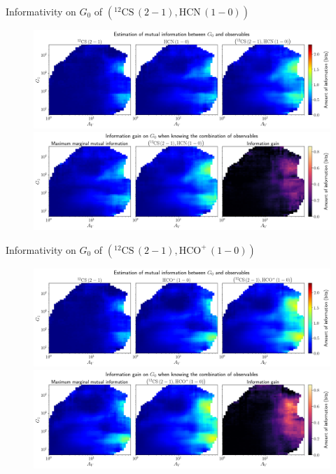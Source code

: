 \documentclass{beamer}
\begin{document}
\begin{frame}{Informativity on $G_0$ of $\left(\mathrm{^{12}CS\,(2-1)},\mathrm{HCN\,(1-0)}\right)$}
    \begin{figure}
        \centering
        \includegraphics[width=0.95\linewidth]{../mi/g0__12cs21_hcn10_mi.png}
        \vfill
        \includegraphics[width=0.95\linewidth]{../mi/g0__12cs21_hcn10_mi_gain.png}
    \end{figure}
\end{frame}

\begin{frame}{Informativity on $G_0$ of $\left(\mathrm{^{12}CS\,(2-1)},\mathrm{HCO^+\,(1-0)}\right)$}
    \begin{figure}
        \centering
        \includegraphics[width=0.95\linewidth]{../mi/g0__12cs21_hcop10_mi.png}
        \vfill
        \includegraphics[width=0.95\linewidth]{../mi/g0__12cs21_hcop10_mi_gain.png}
    \end{figure}
\end{frame}
\end{document}
